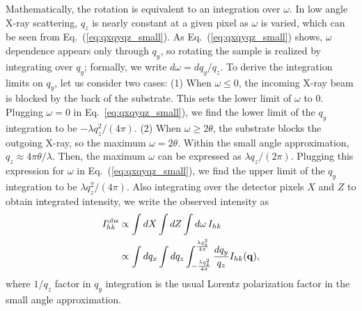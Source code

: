 Mathematically, the rotation is  
equivalent to an integration over $\omega$. In low angle X-ray scattering, 
$q_z$ is nearly constant at a given pixel as $\omega$ is varied, 
which can be seen from 
Eq.~(\ref{eq:qxqyqz_small}). As Eq.~(\ref{eq:qxqyqz_small}) shows, 
$\omega$ dependence appears only through $q_y$, 
so rotating the sample is realized by integrating over $q_y$;
formally, we write $d\omega=dq_y/q_z$.
To derive the integration limits on $q_y$, let us consider two cases: 
(1) When $\omega \leq 0$,
the incoming X-ray beam is blocked by the back of the substrate. This sets 
the lower limit of $\omega$ to 0. Plugging $\omega=0$ in Eq.~\ref{eq:qxqyqz_small}),
we find the lower limit of the $q_y$ integration to be $-\lambda q_z^2/(4\pi)$.
(2) When $\omega \geq 2\theta$, the substrate blocks 
the outgoing X-ray, so the maximum $\omega = 2\theta$. 
Within the small angle approximation, $q_z \approx 4\pi\theta/\lambda$. 
Then, the maximum $\omega$ can be expressed as $\lambda q_z/(2\pi)$.
Plugging this expression for $\omega$ in Eq.~(\ref{eq:qxqyqz_small}),
we find the upper limit of the $q_y$ integration to be $\lambda q_z^2/(4\pi)$.
Also integrating over the detector pixels $X$ and $Z$ to obtain integrated intensity, 
we write the observed intensity as
\begin{align}
  I_{hk}^\textrm{obs} 
    &\propto \int dX \int dZ \int \mathop{d\omega} I_{hk} \nonumber \\
    &\propto \int dq_x \int dq_z 
             \int_{-\frac{\lambda q_z^2}{4\pi}}^{\frac{\lambda q_z^2}{4\pi}} 
             \frac{dq_y}{q_z} 
             I_{hk}(\mathbf{q}),
  \label{eq:I_obs_general}
\end{align}
where $1/q_z$ factor in $q_y$ integration is the usual Lorentz polarization factor
in the small angle approximation. 

